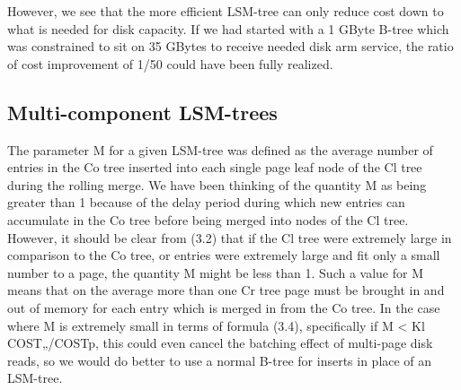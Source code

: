 \documentclass[a4paper,11pt,notitlepage,twoside,openright]{article}
\begin{document}
However, we see that the more efficient LSM-tree can only reduce cost
down to what is needed for disk capacity. If we had started with a 1
GByte B-tree which was constrained to sit on 35 GBytes to receive needed
disk arm service, the ratio of cost improvement of 1/50 could have been
fully realized.


\hypertarget{multi-component-lsm-trees}{%
\subsection{Multi-component LSM-trees}\label{multi-component-lsm-trees}}


The parameter M for a given LSM-tree was defined as the average number
of entries in the Co tree inserted into each single page leaf node of
the Cl tree during the rolling merge. We have been thinking of the
quantity M as being greater than 1 because of the delay period during
which new entries can accumulate in the Co tree before being merged into
nodes of the Cl tree. However, it should be clear from (3.2) that if the
Cl tree were extremely large in comparison to the Co tree, or entries
were extremely large and fit only a small number to a page, the quantity
M might be less than 1. Such a value for M means that on the average
more than one Cr tree page must be brought in and out of memory for each
entry which is merged in from the Co tree. In the case where M is
extremely small in terms of formula (3.4), specifically if M \textless{}
Kl COST„/COSTp, this could even cancel the batching effect of multi-page
disk reads, so we would do better to use a normal B-tree for inserts in
place of an LSM-tree.
\end{document}
